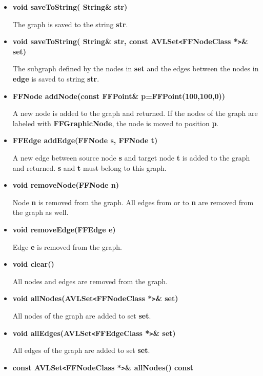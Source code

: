 \begin{itemize}
  The subgraph defined by the nodes in {\bf set} and the edges
  between the nodes in {\bf edge} is saved to file {\bf file}.

\item{\bf void saveToString( String\& str)}

The graph is saved to the string {\bf str}.

\item{\bf void saveToString( String\& str, const
    AVLSet\verb|<|FFNodeClass *\verb|>|\& set)}
      
  The subgraph defined by the nodes in {\bf set} and the edges
  between the nodes in {\bf edge} is saved to string {\bf str}.

\item{\bf FFNode addNode(const FFPoint\& p=FFPoint(100,100,0))}
  
  A new node is added to the graph and returned. If the nodes of
  the graph are labeled with {\bf FFGraphicNode}, the node is
  moved to position {\bf p}.

\item{\bf  FFEdge addEdge(FFNode s, FFNode t)}
  
  A new edge between source node {\bf s} and target node {\bf t}
  is added to the graph and returned. {\bf s} and {\bf t} must
  belong to this graph.

\item{\bf void removeNode(FFNode n)}
  
  Node {\bf n} is removed from the graph. All edges from or to
  {\bf n} are removed from the graph as well.

\item{\bf void removeEdge(FFEdge e)}

Edge {\bf e} is removed from the graph.

\item{\bf void clear()}

All nodes and edges are removed from the graph.

\item{\bf void allNodes(AVLSet\verb|<|FFNodeClass *\verb|>|\& set)}

All nodes of the graph are added to set {\bf set}.

\item{\bf void allEdges(AVLSet\verb|<|FFEdgeClass *\verb|>|\& set)}

All edges of the graph are added to set {\bf set}.

\item{\bf const AVLSet\verb|<|FFNodeClass *\verb|>|\& allNodes()
    const}


\end{itemize}
